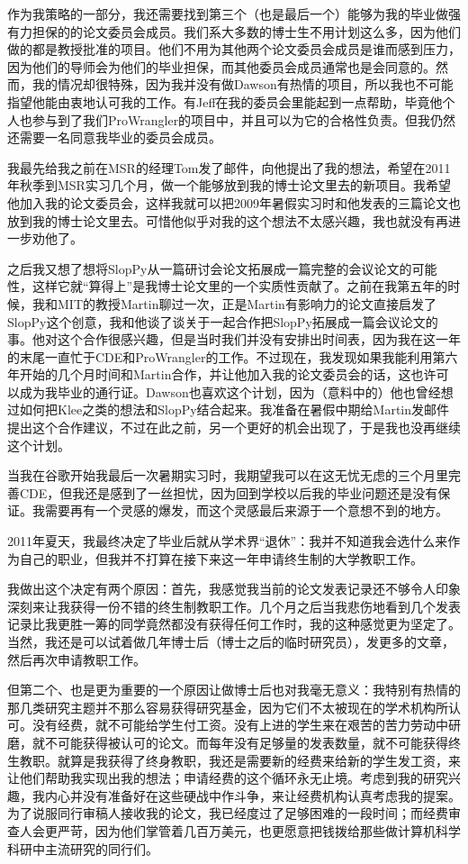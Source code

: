 \documentclass[letter,12pt]{book}
\begin{document}
\begin{CJK}{UTF8}{gbsn}
作为我策略的一部分，我还需要找到第三个（也是最后一个）能够为我的毕业做强有力担保的的论文委员会成员。我们系大多数的博士生不用计划这么多，因为他们做的都是教授批准的项目。他们不用为其他两个论文委员会成员是谁而感到压力，因为他们的导师会为他们的毕业担保，而其他委员会成员通常也是会同意的。然而，我的情况却很特殊，因为我并没有做Dawson有热情的项目，所以我也不可能指望他能由衷地认可我的工作。有Jeff在我的委员会里能起到一点帮助，毕竟他个人也参与到了我们ProWrangler的项目中，并且可以为它的合格性负责。但我仍然还需要一名同意我毕业的委员会成员。

我最先给我之前在MSR的经理Tom发了邮件，向他提出了我的想法，希望在2011年秋季到MSR实习几个月，做一个能够放到我的博士论文里去的新项目。我希望他加入我的论文委员会，这样我就可以把2009年暑假实习时和他发表的三篇论文也放到我的博士论文里去。可惜他似乎对我的这个想法不太感兴趣，我也就没有再进一步劝他了。

之后我又想了想将SlopPy从一篇研讨会论文拓展成一篇完整的会议论文的可能性，这样它就“算得上”是我博士论文里的一个实质性贡献了。之前在我第五年的时候，我和MIT的教授Martin聊过一次，正是Martin有影响力的论文直接启发了SlopPy这个创意，我和他谈了谈关于一起合作把SlopPy拓展成一篇会议论文的事。他对这个合作很感兴趣，但是当时我们并没有安排出时间表，因为我在这一年的末尾一直忙于CDE和ProWrangler的工作。不过现在，我发现如果我能利用第六年开始的几个月时间和Martin合作，并让他加入我的论文委员会的话，这也许可以成为我毕业的通行证。Dawson也喜欢这个计划，因为（意料中的）他也曾经想过如何把Klee之类的想法和SlopPy结合起来。我准备在暑假中期给Martin发邮件提出这个合作建议，不过在此之前，另一个更好的机会出现了，于是我也没再继续这个计划。

当我在谷歌开始我最后一次暑期实习时，我期望我可以在这无忧无虑的三个月里完善CDE，但我还是感到了一丝担忧，因为回到学校以后我的毕业问题还是没有保证。我需要再有一个灵感的爆发，而这个灵感最后来源于一个意想不到的地方。

\breakline

2011年夏天，我最终决定了毕业后就从学术界“退休”：我并不知道我会选什么来作为自己的职业，但我并不打算在接下来这一年申请终生制的大学教职工作。

我做出这个决定有两个原因：首先，我感觉我当前的论文发表记录还不够令人印象深刻来让我获得一份不错的终生制教职工作。几个月之后当我悲伤地看到几个发表记录比我更胜一筹的同学竟然都没有获得任何工作时，我的这种感觉更为坚定了。当然，我还是可以试着做几年博士后（博士之后的临时研究员），发更多的文章，然后再次申请教职工作。

但第二个、也是更为重要的一个原因让做博士后也对我毫无意义：我特别有热情的那几类研究主题并不那么容易获得研究基金，因为它们不太被现在的学术机构所认可。没有经费，就不可能给学生付工资。没有上进的学生来在艰苦的苦力劳动中研磨，就不可能获得被认可的论文。而每年没有足够量的发表数量，就不可能获得终生教职。就算是我获得了终身教职，我还是需要新的经费来给新的学生发工资，来让他们帮助我实现出我的想法；申请经费的这个循环永无止境。考虑到我的研究兴趣，我内心并没有准备好在这些硬战中作斗争，来让经费机构认真考虑我的提案。为了说服同行审稿人接收我的论文，我已经度过了足够困难的一段时间；而经费审查人会更严苛，因为他们掌管着几百万美元，也更愿意把钱拨给那些做计算机科学科研中主流研究的同行们。


\end{CJK}
\end{document}
